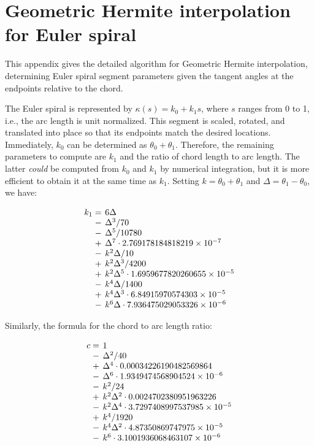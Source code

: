 \documentclass[sigconf, nonacm]{acmart}
\begin{document}
\appendix

\section{Geometric Hermite interpolation for Euler spiral}
\label{appendix:gh}

This appendix gives the detailed algorithm for Geometric Hermite interpolation, determining Euler spiral segment parameters given the tangent angles at the endpoints relative to the chord.

The Euler spiral is represented by $\kappa(s) = k_0 + k_1s$, where $s$ ranges from 0 to 1, i.e., the arc length is unit normalized. This segment is scaled, rotated, and translated into place so that its endpoints match the desired locations. Immediately, $k_0$ can be determined as $\theta_0 + \theta_1$. Therefore, the remaining parameters to compute are $k_1$ and the ratio of chord length to arc length. The latter \emph{could} be computed from $k_0$ and $k_1$ by numerical integration, but it is more efficient to obtain it at the same time as $k_1$. Setting $k = \theta_0 + \theta_1$ and $\Delta = \theta_1 - \theta_0$, we have:

\[
    \setlength\arraycolsep{2pt}
    \begin{array}{rl}
    k_1 = & 6\Delta \\
     - & \Delta^3 / 70 \\
     - & \Delta^5 / 10780 \\
     + & \Delta^7 \cdot 2.769178184818219\times 10^{-7} \\
     - & k^2\Delta / 10 \\
     + & k^2\Delta^3 / 4200 \\
     + & k^2\Delta^5 \cdot 1.6959677820260655\times 10^{-5} \\
     - & k^4\Delta / 1400 \\
     + & k^4\Delta^3 \cdot 6.84915970574303\times 10^{-5} \\
     - & k^6\Delta \cdot 7.936475029053326\times 10^{-6}
    \end{array}
\]

Similarly, the formula for the chord to arc length ratio:

\[
    \setlength\arraycolsep{2pt}
    \begin{array}{rl}
    c = & 1 \\
    - & \Delta^2 / 40 \\
    + & \Delta^4 \cdot 0.00034226190482569864 \\
    - & \Delta^6 \cdot 1.9349474568904524\times 10^{-6} \\
    - & k^2 / 24 \\
    + & k^2\Delta^2 \cdot 0.0024702380951963226 \\
    - & k^2\Delta^4 \cdot 3.7297408997537985\times 10^{-5} \\
    + & k^4 / 1920 \\
    - & k^4\Delta^2 \cdot 4.87350869747975\times 10^{-5} \\
    - & k^6 \cdot 3.1001936068463107\times 10^{-6}
    \end{array}
\]
\end{document}
